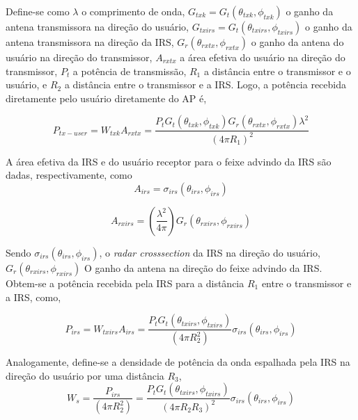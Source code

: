 \documentclass[
	12pt,				%
	openright,			%
	oneside,			%
	a4paper,			%
	english,			%
	brazil				%
	]{abntex2}
\begin{document}
Define-se como $\lambda$ o comprimento de onda,
$G_{txk} = G_{t}(\theta_{txk},\phi_{txk})$ o ganho da antena transmissora na direção do usuário,
$G_{txirs} = G_{t}\left( \theta_{txirs},\phi_{txirs} \right)$ o ganho da antena transmissora na direção da IRS, $G_{r}(\theta_{rxtx},\phi_{rxtx})$ o ganho da antena do usuário na direção do transmissor, $A_{rxtx}$ a área efetiva do usuário na direção do transmissor, $P_{t}$ a potência de transmissão, $R_{1}$ a distância entre o transmissor e o usuário, e $R_{2}$ a distância entre o transmissor e a IRS. Logo, a potência recebida diretamente pelo usuário diretamente do AP é,

\begin{equation}
    P_{tx - user} = W_{txk}A_{rxtx} = \frac{P_{t}G_{t}\left( \theta_{txk},\phi_{txk} \right)G_{r}\left( \theta_{rxtx},\phi_{rxtx} \right)\lambda^{2}}{\left( 4\pi R_{1} \right)^{2}}
\end{equation}


A área efetiva da IRS e do usuário receptor para o feixe advindo da IRS são dadas, respectivamente, como
\begin{equation}
A_{irs} = \sigma_{irs}(\theta_{irs},\phi_{irs})
\end{equation}

\begin{equation}
A_{rxirs} = ( \frac{\lambda^{2}}{4\pi} )G_{r}( \theta_{rxirs},\phi_{rxirs} ) 
\end{equation}


Sendo $\sigma_{irs}(\theta_{irs},\phi_{irs})$, o \emph{radar crosssection} da IRS na direção do usuário,
$G_{r}\left( \theta_{rxirs},\phi_{rxirs} \right)$  O ganho da antena na direção do feixe advindo da IRS. Obtem-se a potência recebida pela IRS para a distância $R_{1}$ entre o transmissor e a IRS, como,

\begin{equation}
    P_{irs} = W_{txirs}A_{irs} = \frac{P_{t}G_{t}(\theta_{txirs},\phi_{txirs})}{(4\pi R_{2}^{2})}\sigma_{irs}\left( \theta_{irs},\phi_{irs} \right)
\end{equation}

Analogamente, define-se a densidade de potência da onda espalhada pela IRS na direção do usuário por uma distância $R_{3}$,
\begin{equation}
    W_{s} = \frac{P_{irs}}{(4\pi R_{2}^{2})} = \frac{P_{t}G_{t}(\theta_{txirs},\phi_{txirs})}{\left( 4\pi R_{2}R_{3} \right)^{2}}\sigma_{irs}\left( \theta_{irs},\phi_{irs} \right)
\end{equation}
\end{document}
